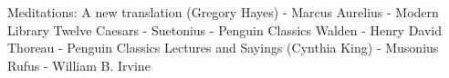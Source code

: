 \begin{thebibliography}{99}

   Meditations: A new translation (Gregory Hayes) - Marcus Aurelius - Modern Library
   Twelve Caesars -  Suetonius - Penguin Classics
   Walden - Henry David Thoreau - Penguin Classics
  \bibitem Lectures and Sayings (Cynthia King) - Musonius Rufus - William B. Irvine

\end{thebibliography}
